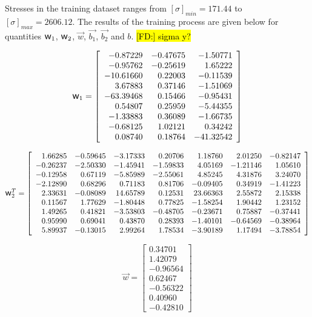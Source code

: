\documentclass[final,5p,times,twocolumn]{elsarticle}
\newcommand{\w}{\mbox{\large\ensuremath{\mathsf{w}}}}
\DeclareRobustCommand{\FD}[1]{ {\begingroup\sethlcolor{VWgreen}\textcolor{black}{\hl{[FD:] #1}}\endgroup} }
\begin{document}
Stresses in the training dataset ranges from $[\sigma]_{min}=171.44$ to $[\sigma]_{max}=2606.12$.
The results of the training process are given below for quantities $\w_1$, $\w_2$, $\overrightarrow{w}$, $\overrightarrow{b_1}$, $\overrightarrow{b_2}$ and $b$.\FD{sigma y?}

\begin{equation*}
\w_1=\left[
\begin{array}{rrr}
 -0.87229 & -0.47675 & -1.50771\\
 -0.95762 & -0.25619 &  1.65222\\
 -10.61660 &  0.22003 & -0.11539\\
  3.67883 &  0.37146 & -1.51069\\
 -63.39468 &  0.15466 & -0.95431\\
  0.54807 &  0.25959 & -5.44355\\
 -1.33883 &  0.36089 & -1.66735\\
 -0.68125 &  1.02121 &  0.34242\\
  0.08740 &  0.18764 & -41.32542
\end{array}\right]
\end{equation*}

\begin{equation*}
\w_2^T=\left[
\begin{array}{rrrrrrrrr}
  1.66285 & -0.59645 & -3.17333 &  0.20706 &  1.18760 &  2.01250 & -0.82147\\
 -0.26237 & -2.50330 & -1.45941 & -1.59833 &  4.05169 & -1.21146 &  1.05610\\
 -0.12958 &  0.67119 & -5.85989 & -2.55061 &  4.85245 &  4.31876 &  3.24070\\
 -2.12890 &  0.68296 &  0.71183 &  0.81706 & -0.09405 &  0.34919 & -1.41223\\
  2.33631 & -0.08089 &  14.65789 &  0.12531 &  23.66363 &  2.55872 &  2.15338\\
  0.11567 &  1.77629 & -1.80448 &  0.77825 & -1.58254 &  1.90442 &  1.23152\\
  1.49265 &  0.41821 & -3.53803 & -0.48705 & -0.23671 &  0.75887 & -0.37441\\
  0.95990 &  0.69041 &  0.43870 &  0.28393 & -1.40101 & -0.64569 & -0.38964\\
  5.89937 & -0.13015 &  2.99264 &  1.78534 & -3.90189 &  1.17494 & -3.78854
\end{array}\right]
\end{equation*}

\begin{equation*}
\overrightarrow{w}=\left[
\begin{array}{r}
  0.34701\\
  1.42079\\
 -0.96564\\
  0.62467\\
 -0.56322\\
  0.40960\\
 -0.42810
\end{array}\right]
\end{equation*}
\end{document}
